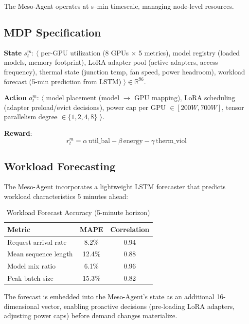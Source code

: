 \documentclass[conference,10pt]{IEEEtran}
\begin{document}
The Meso-Agent operates at s--min timescale, managing node-level resources.

\subsection{MDP Specification}

\textbf{State} $s^{m}_t$: $\langle$ per-GPU utilization (8 GPUs $\times$ 5 metrics), model registry (loaded models, memory footprint), LoRA adapter pool (active adapters, access frequency), thermal state (junction temp, fan speed, power headroom), workload forecast (5-min prediction from LSTM) $\rangle \in \mathbb{R}^{96}$.

\textbf{Action} $a^{m}_t$: $\langle$ model placement (model $\to$ GPU mapping), LoRA scheduling (adapter preload/evict decisions), power cap per GPU $\in [200W, 700W]$, tensor parallelism degree $\in \{1, 2, 4, 8\}$ $\rangle$.

\textbf{Reward}:
\begin{equation}
r^{m}_t = \alpha\,\text{util\_bal} - \beta\,\text{energy} - \gamma\,\text{therm\_viol}
\end{equation}


\subsection{Workload Forecasting}

The Meso-Agent incorporates a lightweight LSTM forecaster that predicts workload characteristics 5 minutes ahead:

\begin{table}[!htbp]
\caption{Workload Forecast Accuracy (5-minute horizon)}
\label{tab:forecast}
\centering\scriptsize
\begin{tabular}{@{}lcc@{}}
\toprule
\textbf{Metric} & \textbf{MAPE} & \textbf{Correlation} \\
\midrule
Request arrival rate & 8.2\% & 0.94 \\
Mean sequence length & 12.4\% & 0.88 \\
Model mix ratio & 6.1\% & 0.96 \\
Peak batch size & 15.3\% & 0.82 \\
\bottomrule
\end{tabular}
\end{table}

The forecast is embedded into the Meso-Agent's state as an additional 16-dimensional vector, enabling proactive decisions (pre-loading LoRA adapters, adjusting power caps) before demand changes materialize.
\end{document}
